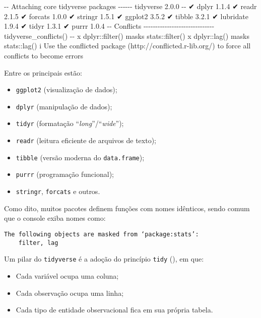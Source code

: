 \documentclass[
  12pt,
  letterpaper,
  DIV=11,
  numbers=noendperiod]{scrreprt}
\newenvironment{Shaded}{\begin{snugshade}}{\end{snugshade}}
\newcommand{\NormalTok}[1]{\textcolor[rgb]{0.00,0.23,0.31}{#1}}
\providecommand{\tightlist}{%
  \setlength{\itemsep}{0pt}\setlength{\parskip}{0pt}}\usepackage{longtable,booktabs,array}
\begin{document}
\begin{Shaded}
\begin{Highlighting}[]
\NormalTok{{-}{-} Attaching core tidyverse packages {-}{-}{-}{-}{-}{-} tidyverse 2.0.0 {-}{-}}
\NormalTok{✔ dplyr     1.1.4     ✔ readr     2.1.5}
\NormalTok{✔ forcats   1.0.0     ✔ stringr   1.5.1}
\NormalTok{✔ ggplot2   3.5.2     ✔ tibble    3.2.1}
\NormalTok{✔ lubridate 1.9.4     ✔ tidyr     1.3.1}
\NormalTok{✔ purrr     1.0.4     }
\NormalTok{{-}{-} Conflicts {-}{-}{-}{-}{-}{-}{-}{-}{-}{-}{-}{-}{-}{-}{-}{-}{-}{-}{-}{-}{-}{-}{-}{-}{-}{-}{-}{-}{-}{-} tidyverse\_conflicts() {-}{-}}
\NormalTok{x dplyr::filter() masks stats::filter()}
\NormalTok{x dplyr::lag()    masks stats::lag()}
\NormalTok{i Use the conflicted package (http://conflicted.r{-}lib.org/) }
\NormalTok{  to force all conflicts to become errors}
\end{Highlighting}
\end{Shaded}

\noindent Entre os principais estão:

\begin{itemize}
\tightlist
\item
  \texttt{ggplot2} (visualização de dados);
\item
  \texttt{dplyr} (manipulação de dados);
\item
  \texttt{tidyr} (formatação ``\emph{long}''/``\emph{wide}'');
\item
  \texttt{readr} (leitura eficiente de arquivos de texto);
\item
  \texttt{tibble} (versão moderna do \texttt{data.frame});
\item
  \texttt{purrr} (programação funcional);
\item
  \texttt{stringr}, \texttt{forcats} e outros.
\end{itemize}

Como dito, muitos pacotes definem funções com nomes idênticos, sendo
comum que o console exiba nomes como:

\begin{verbatim}
The following objects are masked from ‘package:stats’:
    filter, lag
\end{verbatim}

Um pilar do \texttt{tidyverse} é a adoção do princípio \texttt{tidy}
(), em que:

\begin{itemize}
\tightlist
\item
  Cada variável ocupa uma coluna;
\item
  Cada observação ocupa uma linha;
\item
  Cada tipo de entidade observacional fica em sua própria tabela.
\end{itemize}
\end{document}
